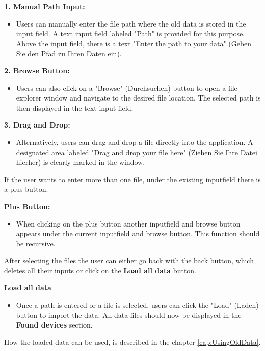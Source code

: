 \documentclass[]{scrreprt}
\begin{document}
\textbf{1. Manual Path Input:}
\begin{itemize}
    \item Users can manually enter the file path where the old data is stored in the input field.
    A text input field labeled "Path" is provided for this purpose.
     Above the input field, there is a text "Enter the path to your data" (Geben Sie den Pfad zu Ihren Daten ein).
\end{itemize}

\textbf{2. Browse Button:}
\begin{itemize}
    \item Users can also click on a "Browse" (Durchsuchen) button to open a file explorer window and navigate to the desired file location.
     The selected path is then displayed in the text input field.
\end{itemize}

\textbf{3. Drag and Drop:}
\begin{itemize}
    \item Alternatively, users can drag and drop a file directly into the application.
     A designated area labeled "Drag and drop your file here" (Ziehen Sie Ihre Datei hierher) is clearly marked in the window.
\end{itemize}

If the user wants to enter more than one file, under the existing inputfield there is a plus button. 

\textbf{Plus Button:}
\begin{itemize}
   \item When clicking on the plus button another inputfield and browse button appears under the current inputfield and browse button. This function should be recursive. 
\end{itemize}

After selecting the files the user can either go back with the back button, which deletes all their inputs or click on the \textbf{Load all data} button. 

\textbf{Load all data}
\begin{itemize}
    \item Once a path is entered or a file is selected, users can click the "Load" (Laden) button to import the data. 
    All data files should now be displayed in the \textbf{Found devices} section. 
\end{itemize}

How the loaded data can be used, is described in the chapter \ref{cap:UsingOldData}. 
\end{document}
